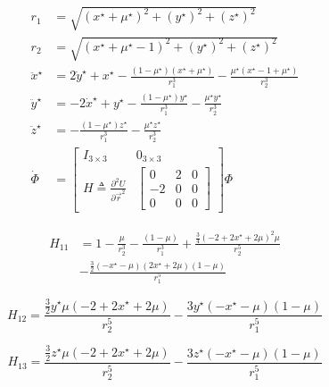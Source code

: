 \documentclass[conf]{new-aiaa}
\begin{document}
\begin{multicols}{2}
\begin{align}
    r_1 & = \sqrt{(x^\star+\mu^\star)^2 + (y^\star)^2 + (z^\star)^2} \\
    r_2 & = \sqrt{(x^\star+\mu^\star-1)^2 + (y^\star)^2 + (z^\star)^2} \\
    \ddot{x}^\star & = 2\dot{y}^\star + x^\star - \frac{(1-\mu^\star)(x^\star + \mu^\star)}{r_1^3} - 
        \frac{\mu^\star (x^\star - 1 + \mu^\star)}{r_2^3} \\
    \ddot{y}^\star & = -2\dot{x}^\star + y^\star - \frac{(1 - \mu^\star)y^\star}{r_1^3} - \frac{\mu^\star y^\star}{r_2^3} \\
    \ddot{z}^\star & = -\frac{(1-\mu^\star)z^\star}{r_1^3} - \frac{\mu^\star z^\star}{r_2^3} \\
    \dot{\Phi} & = \begin{bmatrix} I_{3 \times 3} & 0_{3 \times 3} \\ H \triangleq \frac{\partial^2 U}{\partial \overrightarrow{r}^2} & \begin{bmatrix} 0 & 2 & 0 \\ -2 & 0 & 0 \\ 0 & 0 & 0 \end{bmatrix} \end{bmatrix} \Phi
\end{align}

\begin{equation}
    \begin{aligned}
        H_{11} &= 1 - \frac{\mu}{r_2^{3}} - \frac{\left( 1 - \mu \right)}{r_1^{3}} + \frac{\frac{3}{4} \left( -2 + 2 x^{\star} + 2 \mu \right)^{2} \mu}{r_2^{5}} \\
        &- \frac{\frac{3}{2} \left(  - x^{\star} - \mu \right) \left( 2 x^{\star} + 2 \mu \right) \left( 1 - \mu \right)}{r_1^{5}}
    \end{aligned}
  \end{equation}

    
\begin{equation}
    H_{12} = \frac{\frac{3}{2} y^{\star} \mu \left( -2 + 2 x^{\star} + 2 \mu \right)}{r_2^{5}} - \frac{3 y^{\star} \left(  - x^{\star} - \mu \right) \left( 1 - \mu \right)}{r_1^{5}}
\end{equation}
    
    
\begin{equation}
    H_{13} =\frac{\frac{3}{2} z^{\star} \mu \left( -2 + 2 x^{\star} + 2 \mu \right)}{r_2^{5}} - \frac{3 z^{\star} \left(  - x^{\star} - \mu \right) \left( 1 - \mu \right)}{r_1^{5}}
\end{equation}
    

\end{multicols}
\end{document}
